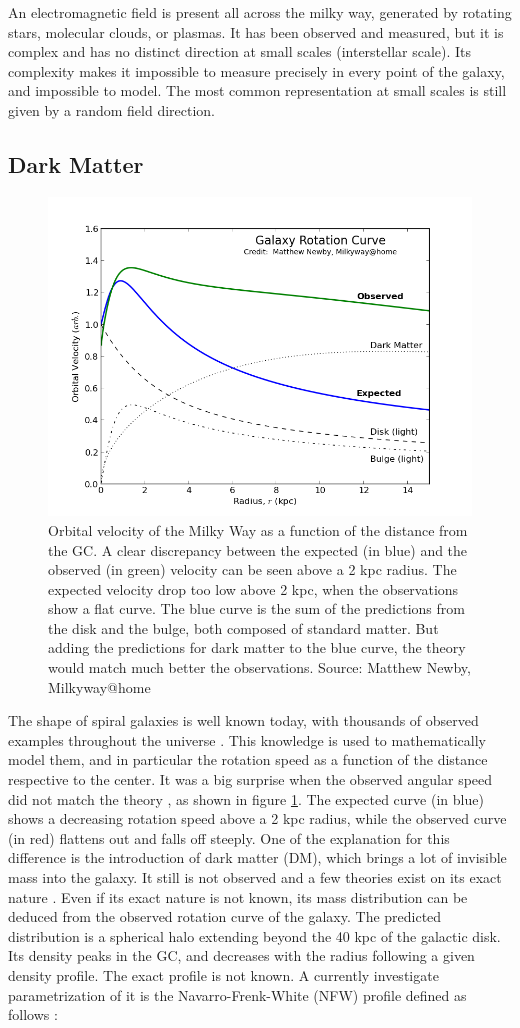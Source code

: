 An electromagnetic field is present all across the milky way, generated by rotating stars, molecular clouds, or plasmas. It has been observed and measured, but it is complex and has no distinct direction at small scales (interstellar scale). Its complexity makes it impossible to measure precisely in every point of the galaxy, and impossible to model. The most common representation at small scales is still given by a random field direction.

\subsection{Dark Matter}

\begin{figure}[h]
 \centering
 \includegraphics[width=.5\linewidth]{pic/theory/gal_rotation_curve.png}
 \caption{Orbital velocity of the Milky Way as a function of the distance from the GC. A clear discrepancy between the expected (in blue) and the observed (in green) velocity can be seen above a 2 kpc radius. The expected velocity drop too low above 2 kpc, when the observations show a flat curve. The blue curve is the sum of the predictions from the disk and the bulge, both composed of standard matter. But adding the predictions for dark matter to the blue curve, the theory would match much better the observations. Source: Matthew Newby, Milkyway@home}
 \label{fig:gal_rotation_curve}
\end{figure}

The shape of spiral galaxies is well known today, with thousands of observed examples throughout the universe . This knowledge is used to mathematically model them, and in particular the rotation speed as a function of the distance respective to the center. It was a big surprise when the observed angular speed did not match the theory , as shown in figure \ref{fig:gal_rotation_curve}. The expected curve (in blue) shows a decreasing rotation speed above a 2 kpc radius, while the observed curve (in red) flattens out and falls off steeply.
One of the explanation for this difference is the introduction of dark matter (DM), which brings a lot of invisible mass into the galaxy. It still is not observed and a few theories exist on its exact nature . Even if its exact nature is not known, its mass distribution can be deduced from the observed rotation curve of the galaxy. The predicted distribution is a spherical halo extending beyond the 40 kpc of the galactic disk. Its density peaks in the GC, and decreases with the radius following a given density profile. The exact profile is not known. A currently investigate parametrization of it is the Navarro-Frenk-White (NFW) profile defined as follows :

